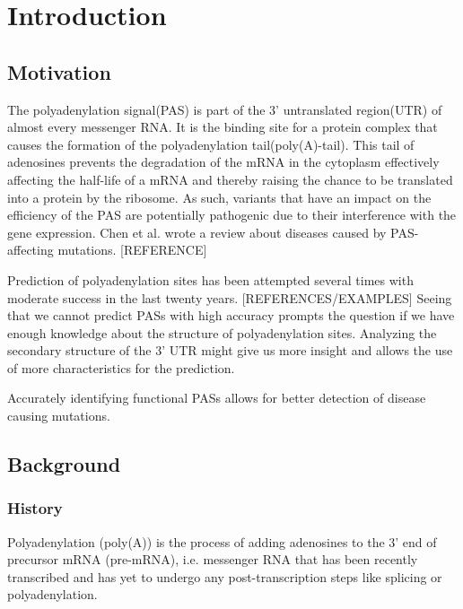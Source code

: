 \section{Introduction}
\subsection{Motivation}
The polyadenylation signal(PAS) is part of the 3' untranslated region(UTR) of almost every messenger RNA. It is the binding site for a protein complex that causes the formation of the polyadenylation tail(poly(A)-tail). This tail of adenosines prevents the degradation of the mRNA in the cytoplasm effectively affecting the half-life of a mRNA and thereby raising the chance to be translated into a protein by the ribosome. As such, variants that have an impact on the efficiency of the PAS are potentially pathogenic due to their interference with the gene expression. Chen et al. wrote a review about diseases caused by PAS-affecting mutations. [REFERENCE] 

Prediction of polyadenylation sites has been attempted several times with moderate success in the last twenty years. [REFERENCES/EXAMPLES] Seeing that we cannot predict PASs with high accuracy prompts the question if we have enough knowledge about the structure of polyadenylation sites. Analyzing the secondary structure of the 3' UTR might give us more insight and allows the use of more characteristics for the prediction.

Accurately identifying functional PASs allows for better detection of disease causing mutations.  
\subsection{Background}
\subsubsection{History}
Polyadenylation (poly(A)) is the process of adding adenosines to the 3' end of precursor mRNA (pre-mRNA), i.e. messenger RNA that has been recently transcribed and has yet to undergo any post-transcription steps like splicing or polyadenylation.

